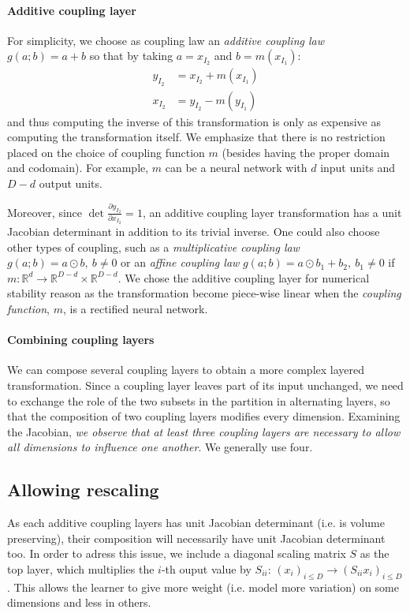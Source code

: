 \documentclass{article}
\def\R{{\mathbb{R}}}
\begin{document}
\paragraph*{Additive coupling layer}
For simplicity, we choose as coupling law an
\textit{additive coupling law} $g(a ; b) = a + b$ so that by taking
$a = x_{I_{2}}$ and $b = m(x_{I_{1}})$:
\begin{align*}
y_{I_{2}} &= x_{I_{2}} + m(x_{I_{1}}) \\
x_{I_{2}} &= y_{I_{2}} - m(y_{I_{1}})
\end{align*}
and thus computing the inverse of this
transformation is only as expensive as computing the transformation itself.
We emphasize that there is no restriction placed on the choice of coupling function $m$ (besides having the proper domain and codomain).
For example, $m$ can be a neural network with $d$ input units and $D - d$ output units.




Moreover, since $\det \frac{\partial y_{I_{2}}}{\partial x_{I_{2}}} = 1$, an 
additive coupling layer transformation has a unit Jacobian
determinant in addition to its trivial inverse. One could also
choose other types of coupling, such as a
\textit{multiplicative coupling law} $g(a ; b) = a \odot b,~b \neq 0$ or an
\textit{affine coupling law} $g(a ; b) = a \odot b_{1} + b_{2},~b_{1} \neq 0$ if 
$m: \R^{d} \rightarrow \R^{D-d} \times \R^{D-d}$. We chose the
additive coupling layer for numerical stability reason as the transformation
become piece-wise linear when the {\em coupling function}, $m$, is a rectified
neural network.


\paragraph*{Combining coupling layers}
We can compose several coupling layers to obtain a more complex
layered transformation.
Since a coupling layer leaves part of its input unchanged, we need to
exchange the role of
the two subsets in the partition in alternating layers, so that the composition of two coupling layers 
modifies every dimension. Examining the Jacobian, {\em we observe that at least three coupling
layers are necessary to allow all dimensions to influence one another}. We generally use four.

\subsection{Allowing rescaling}
As each additive coupling layers has unit Jacobian determinant
(i.e. is volume preserving), their
composition will necessarily have unit Jacobian determinant too.
In order to adress this issue, we include
a diagonal scaling matrix $S$ as the top layer, which multiplies the
$i$-th ouput value by $S_{ii}$:
$(x_{i})_{i \leq D} \rightarrow (S_{ii}x_{i})_{i \leq D}$. This allows
the learner to give more weight (i.e. model more variation)
on some dimensions and less in others.
\end{document}
